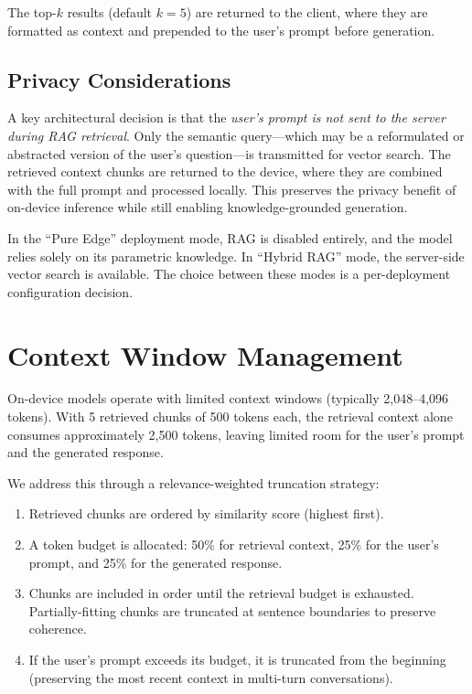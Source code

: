 \documentclass[12pt, letterpaper, twoside]{report}
\begin{document}
The top-$k$ results (default $k = 5$) are returned to the client, where they are formatted as context and prepended to the user's prompt before generation.

\subsection{Privacy Considerations}
\label{subsec:rag_privacy}

A key architectural decision is that the \textit{user's prompt is not sent to the server during RAG retrieval}. Only the semantic query---which may be a reformulated or abstracted version of the user's question---is transmitted for vector search. The retrieved context chunks are returned to the device, where they are combined with the full prompt and processed locally. This preserves the privacy benefit of on-device inference while still enabling knowledge-grounded generation.

In the ``Pure Edge'' deployment mode, RAG is disabled entirely, and the model relies solely on its parametric knowledge. In ``Hybrid RAG'' mode, the server-side vector search is available. The choice between these modes is a per-deployment configuration decision.

\section{Context Window Management}
\label{sec:context_management}

On-device models operate with limited context windows (typically 2,048--4,096 tokens). With 5 retrieved chunks of 500 tokens each, the retrieval context alone consumes approximately 2,500 tokens, leaving limited room for the user's prompt and the generated response.

We address this through a relevance-weighted truncation strategy:

\begin{enumerate}[itemsep=3pt]
\item Retrieved chunks are ordered by similarity score (highest first).
\item A token budget is allocated: 50\% for retrieval context, 25\% for the user's prompt, and 25\% for the generated response.
\item Chunks are included in order until the retrieval budget is exhausted. Partially-fitting chunks are truncated at sentence boundaries to preserve coherence.
\item If the user's prompt exceeds its budget, it is truncated from the beginning (preserving the most recent context in multi-turn conversations).
\end{enumerate}
\end{document}
